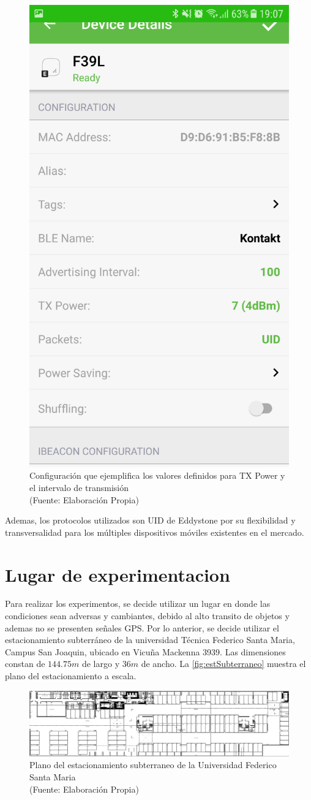 \begin{figure}[ht!]
\centering
\includegraphics[width=.3\textwidth]{figures/kontaktapp2.png}
\caption[abs]{Configuración que ejemplifica los valores definidos para TX Power y el intervalo de transmisión\\
{\scriptsize (Fuente: Elaboración Propia)}}
\label{fig:kontaktapp2}
\end{figure}

Ademas, los protocolos utilizados son UID de Eddystone por su flexibilidad y transversalidad para los múltiples dispositivos móviles existentes en el mercado.

\section{Lugar de experimentacion}

Para realizar los experimentos, se decide utilizar un lugar en donde las condiciones sean adversas y cambiantes, debido al alto transito de objetos y ademas no se presenten señales GPS. Por lo anterior, se decide utilizar el estacionamiento subterráneo de la universidad Técnica Federico Santa Maria, Campus San Joaquin, ubicado en Vicuña Mackenna 3939. Las dimensiones constan de $144.75m$ de largo y $36m$ de ancho. La \autoref{fig:estSubterraneo} muestra el plano del estacionamiento a escala.

\begin{figure}[ht!]
\centering
\includegraphics[width=.6\textwidth]{figures/estSubterraneo.png}
\caption[abs]{Plano del estacionamiento subterraneo de la Universidad Federico Santa Maria\\
{\scriptsize (Fuente: Elaboración Propia)}}
\label{fig:estSubterraneo}
\end{figure}

